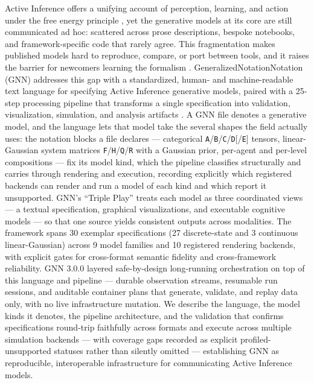 \documentclass[
  english,
  9pt,
]{extarticle}
\begin{document}
Active Inference offers a unifying account of perception, learning, and
action under the free energy principle \citep{friston2010}, yet the
generative models at its core are still communicated ad hoc: scattered
across prose descriptions, bespoke notebooks, and framework-specific
code that rarely agree. This fragmentation makes published models hard
to reproduce, compare, or port between tools, and it raises the barrier
for newcomers learning the formalism \citep{parr2022}.
GeneralizedNotationNotation (GNN) addresses this gap with a
standardized, human- and machine-readable text language for specifying
Active Inference generative models, paired with a 25-step processing
pipeline that transforms a single specification into validation,
visualization, simulation, and analysis artifacts \citep{gnn2023}. A GNN
file denotes a generative model, and the language lets that model take
the several shapes the field actually uses: the notation blocks a file
declares --- categorical
\texttt{A}/\texttt{B}/\texttt{C}/\texttt{D}{[}/\texttt{E}{]} tensors,
linear-Gaussian system matrices
\texttt{F}/\texttt{H}/\texttt{Q}/\texttt{R} with a Gaussian prior,
per-agent and per-level compositions --- fix its model kind, which the
pipeline classifies structurally and carries through rendering and
execution, recording explicitly which registered backends can render and
run a model of each kind and which report it unsupported. GNN's ``Triple
Play'' treats each model as three coordinated views --- a textual
specification, graphical visualizations, and executable cognitive models
--- so that one source yields consistent outputs across modalities. The
framework spans 30 exemplar specifications (27 discrete-state and 3
continuous linear-Gaussian) across 9 model families and 10 registered
rendering backends, with explicit gates for cross-format semantic
fidelity and cross-framework reliability. GNN 3.0.0 layered
safe-by-design long-running orchestration on top of this language and
pipeline --- durable observation streams, resumable run sessions, and
auditable container plans that generate, validate, and replay data only,
with no live infrastructure mutation. We describe the language, the
model kinds it denotes, the pipeline architecture, and the validation
that confirms specifications round-trip faithfully across formats and
execute across multiple simulation backends --- with coverage gaps
recorded as explicit profiled-unsupported statuses rather than silently
omitted --- establishing GNN as reproducible, interoperable
infrastructure for communicating Active Inference models.
\end{document}
